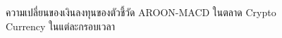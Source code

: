 \begin{figure}[!htb]
    \centering
    \caption{ความเปลี่ยนของเงินลงทุนของตัวชี้วัด AROON-MACD ในตลาด Crypto Currency ในแต่ละกรอบเวลา}
    \label{fig:aroon-macd-crypto-all}
\end{figure}


